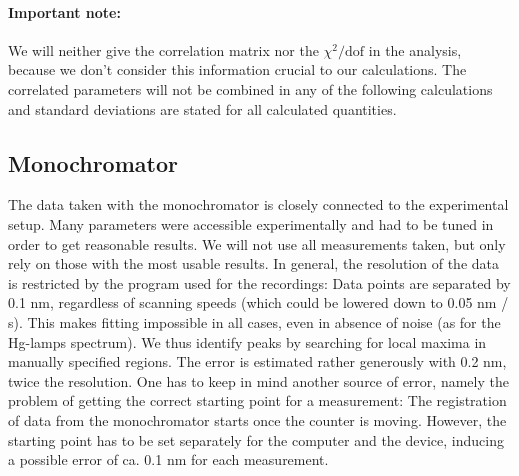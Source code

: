 \paragraph{\textbf{Important note:}}
\label{par:important note}
We will neither give the correlation matrix nor the $\chi^2/\mathrm{dof}$ in the analysis, 
because we don't consider this information crucial to our calculations. The correlated parameters will
not be combined in any of the following calculations and standard deviations are stated for all
calculated quantities. 



\clearpage


\subsection{Monochromator}
The data taken with the monochromator is closely connected to the experimental setup. Many parameters were accessible 
experimentally and had to be tuned in order to get reasonable results. We will not use all measurements taken, but only 
rely on those with the most usable results. In general, the resolution of the data is restricted by the program used for 
the recordings: Data points are separated by 0.1 nm, regardless of scanning speeds (which could be lowered down to 0.05 
nm / s). This makes fitting impossible in all cases, even in absence of noise (as for the Hg-lamps spectrum). We thus 
identify peaks by searching for local maxima in manually specified regions. The error is estimated rather generously with 
0.2 nm, twice the resolution. One has to keep in mind another source of error, namely the problem of getting the correct 
starting point for a measurement: The registration of data from the monochromator starts once the counter is moving.
However, the starting point has to be set separately for the computer and the device, inducing a possible error of ca. 
0.1 nm for each measurement. 

